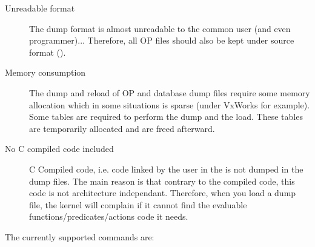 \begin{description}

\item[Unreadable format] The dump format is almost unreadable to the
common user (and even programmer)... Therefore, all OP files should also be
kept under source format ().

\item[Memory consumption] The dump and reload of OP and database dump files
require some memory allocation which in some situations is sparse (under
VxWorks for example). Some tables are required to perform the dump and the
load. These tables are temporarily allocated and are freed afterward. 

\item[No C compiled code included] C Compiled code, i.e. code linked by the
user in the \PK{} is not dumped in the \OPRS{} dump files. The main reason is
that contrary to the \OPRS{} compiled code, this code is not architecture
independant. Therefore, when you load a \OPRS{} dump file, the kernel will
complain if it cannot find the evaluable functions/predicates/actions code it
needs.

\end{description}

The currently supported commands are:

